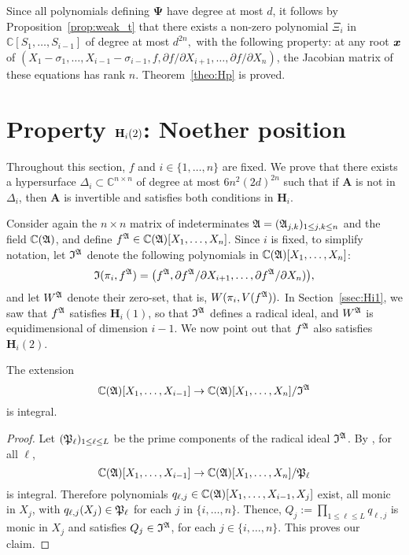 \documentclass[sigconf]{acmart}
\def\mA{{\bm A}}
\def\xb{\textit{\textbf{x}}}
\def\C{\mathbb{C}}
\def\pa{\partial}
\def\D{\Delta}
\def\I{\frak{I}}
\def\A{\frak{A}}
\def\fp{\frak{P}}
\begin{document}
Since all polynomials defining $\bm\Psi$ have degree at most $d$, it
follows by Proposition~\ref{prop:weak_t} that there exists a non-zero
polynomial $\Xi_i$ in $\C[S_1,\dots,S_{i-1}]$ of degree at most
$d^{2n},$ with the following property: at any root $\xb$ of
$(X_1-\sigma_1,\dots,X_{i-1}-\sigma_{i-1},f, {\pa f}/{\pa
  X_{i+1}},\dots,{\pa f}/{\pa X_n})$, the Jacobian matrix of these
equations has rank $n$. Theorem~\ref{theo:Hp} is proved.


\section{Property ${\bf H}_i(2)$: Noether position}\label{sec:Hi2}

Throughout this section, $f$ and $i \in \{1,\hdots,n\}$ are fixed. We
prove that there exists a hypersurface $\D_{i} \subset \C^{n\times
  n}$ of degree at most $6n^2(2d)^{2n}$ such that if $\mA$ is not in $\D_{i}$,
then $\mA$ is invertible and satisfies both conditions in
$\textbf{H}_i$.

Consider again the $n\times n$ matrix of indeterminates
$\A=(\A_{j,k})_{1 \le j,k \le n}$ and the field $\C(\A)$,
and define $f^{\A} \in \C(\A)[X_1,\dots,X_n]$.  Since $i$ is fixed, to
simplify notation, let $\I^\A$ denote the following polynomials in
$\C(\A)[X_1,\dots,X_n]$:
$$\I(\pi_i,f^\A)= \big (f^\A, {\pa f^\A}/{\pa X_{i+1}},\dots,{\pa
  f^\A}/{\pa X_n}) \big ),$$ and let $W^\A$ denote their zero-set,
that is, $W(\pi_i,V(f^\A)).$ In Section~\ref{ssec:Hi1}, we saw that
$f^\A$ satisfies $\textbf{H}_i(1)$, so that $\I^\A$ defines a
radical ideal, and $W^\A$ is equidimensional of dimension $i-1$. We
now point out that $f^\A$ also satisfies $\textbf{H}_i(2)$.


\begin{lemma} 
 The extension $$\C(\A)[X_1,\dots,X_{i-1}]\rightarrow
 \C(\A)[X_1,\dots,X_n]/\I^{\A}$$ is integral.
\end{lemma}
\begin{proof}
  Let $(\fp_\ell)_{1 \le \ell \leq L}$ be the prime components of
  the radical ideal $\I^\A$. By \cite[Proposition 1]{EMP}, for all
  $\ell$,
  \[
    \C(\A)[X_1,\dots,X_{i-1}]\rightarrow\C(\A)[X_1,\dots,X_n]/\fp_\ell
  \] 
  is integral. Therefore polynomials
  $q_{\ell,j}\in\C(\A)[X_1,\dots,X_{i-1},X_j]$ exist, all monic in
  $X_j$, with $q_{\ell,j}(X_j)\in \fp_\ell$ for each $j$ in
  $\{i,\hdots,n\}.$ Thence, $ Q_{j} := \prod_{1 \le \ell\le L}
  q_{\ell,j}$ is monic in $X_j$ and satisfies $ Q_{j} \in \I^\A$, for
  each $j \in \{i,\hdots,n\}.$ This proves our claim.
\end{proof}
\end{document}
